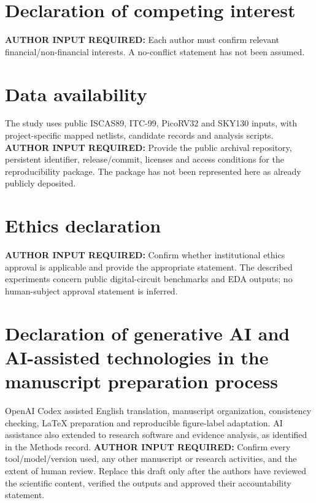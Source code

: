 \documentclass[preprint,12pt]{elsarticle}
\newcommand{\AuthorInput}[1]{\textbf{AUTHOR INPUT REQUIRED:} #1}
\begin{document}
\section*{Declaration of competing interest}
\AuthorInput{Each author must confirm relevant financial/non-financial interests. A no-conflict statement has not been assumed.}

\section*{Data availability}
The study uses public ISCAS89, ITC-99, PicoRV32 and SKY130 inputs, with project-specific mapped netlists, candidate records and analysis scripts. \AuthorInput{Provide the public archival repository, persistent identifier, release/commit, licenses and access conditions for the reproducibility package. The package has not been represented here as already publicly deposited.}

\section*{Ethics declaration}
\AuthorInput{Confirm whether institutional ethics approval is applicable and provide the appropriate statement. The described experiments concern public digital-circuit benchmarks and EDA outputs; no human-subject approval statement is inferred.}

\section*{Declaration of generative AI and AI-assisted technologies in the manuscript preparation process}
OpenAI Codex assisted English translation, manuscript organization, consistency checking, LaTeX preparation and reproducible figure-label adaptation. AI assistance also extended to research software and evidence analysis, as identified in the Methods record. \AuthorInput{Confirm every tool/model/version used, any other manuscript or research activities, and the extent of human review. Replace this draft only after the authors have reviewed the scientific content, verified the outputs and approved their accountability statement.}


\end{document}
